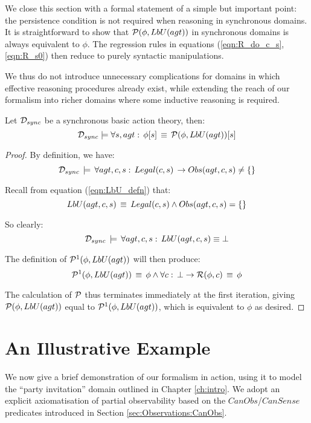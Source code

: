 We close this section with a formal statement of a simple but important
point: the persistence condition is not required when reasoning in
synchronous domains. It is straightforward to show that $\mathcal{P}(\phi,LbU(agt))$
in synchronous domains is always equivalent to $\phi$. The regression
rules in equations (\ref{eqn:R_do_c_s},\ref{eqn:R_s0}) then reduce
to purely syntactic manipulations.

We thus do not introduce unnecessary complications for domains in
which effective reasoning procedures already exist, while extending
the reach of our formalism into richer domains where some inductive
reasoning is required.

\begin{thm}
Let $\mathcal{D}_{sync}$ be a synchronous basic action theory, then:\[
\mathcal{D}_{sync}\models\forall s,agt:\,\phi[s]\,\equiv\,\mathcal{P}(\phi,LbU(agt))[s]\]

\end{thm}
\begin{proof}
By definition, we have:\[
\mathcal{D}_{sync}\,\models\,\forall agt,c,s:\, Legal(c,s)\,\rightarrow Obs(agt,c,s)\neq\{\}\]


Recall from equation (\ref{eqn:LbU_defn}) that:\[
LbU(agt,c,s)\,\equiv\, Legal(c,s)\wedge Obs(agt,c,s)=\{\}\]


So clearly:\[
\mathcal{D}_{sync}\,\models\,\forall agt,c,s:\,LbU(agt,c,s)\equiv\bot\]


The definition of $\mathcal{P}^{1}(\phi,LbU(agt))$ will then produce:\[
\mathcal{P}^{1}(\phi,LbU(agt))\,\equiv\,\phi\wedge\forall c:\,\bot\rightarrow\mathcal{R}(\phi,c)\,\equiv\,\phi\]


The calculation of $\mathcal{P}$ thus terminates immediately at the first
iteration, giving $\mathcal{P}(\phi,LbU(agt))$ equal to $\mathcal{P}^{1}(\phi,LbU(agt))$,
which is equivalent to $\phi$ as desired. 
\end{proof}

\section{An Illustrative Example\label{sec:Knowledge:Example}}

We now give a brief demonstration of our formalism in action, using
it to model the {}``party invitation'' domain outlined in Chapter
\ref{ch:intro}. We adopt an explicit axiomatisation of partial observability
based on the $CanObs$/$CanSense$ predicates introduced in Section
\ref{sec:Observations:CanObs}.

